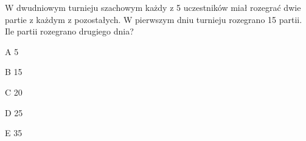 \begin{tresc}
W dwudniowym turnieju szachowym każdy z 5 uczestników miał rozegrać dwie partie z każdym z pozostałych. W pierwszym dniu turnieju rozegrano 15 partii. Ile partii rozegrano drugiego dnia?
\end{tresc}
\begin{wariant}{A} 5 \end{wariant}
\begin{wariant}{B} 15 \end{wariant}
\begin{wariant}{C} 20 \end{wariant}
\begin{wariant}{D} 25 \end{wariant}
\begin{wariant}{E} 35 \end{wariant}
